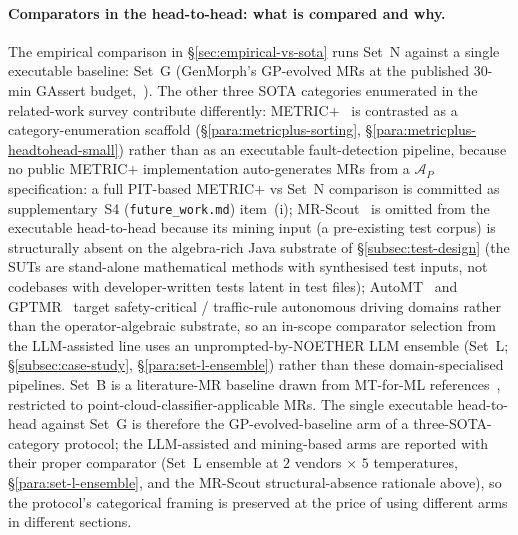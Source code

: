 \documentclass[acmsmall,screen,review]{acmart}
\begin{document}
\paragraph{Comparators in the head-to-head: what is compared and why.}
\label{para:comparators-and-why}
The empirical comparison in \S\ref{sec:empirical-vs-sota} runs Set~N
against a single executable baseline: Set~G (GenMorph's GP-evolved
MRs at the published 30-min GAssert budget,~\cite{GenMorph2024}). The
other three SOTA categories enumerated in the related-work survey
contribute differently: METRIC$+$~\cite{SunMETRICplus2021} is contrasted
as a category-enumeration scaffold (\S\ref{para:metricplus-sorting},
\S\ref{para:metricplus-headtohead-small}) rather than as an executable
fault-detection pipeline, because no public METRIC$+$ implementation
auto-generates MRs from a $\mathcal{A}_{P}$ specification: a full
PIT-based METRIC$+$ vs Set~N comparison is committed as supplementary~S4 (\texttt{future\_work.md})
item~(i); MR-Scout~\cite{MRScout2024} is omitted from the executable
head-to-head because its mining input (a pre-existing test corpus) is
structurally absent on the algebra-rich Java substrate of
\S\ref{subsec:test-design} (the SUTs are stand-alone mathematical
methods with synthesised test inputs, not codebases with developer-written
tests latent in test files); AutoMT~\cite{AutoMT2025} and
GPTMR~\cite{GPTMR2025} target safety-critical / traffic-rule autonomous
driving domains rather than the operator-algebraic substrate, so an
in-scope comparator selection from the LLM-assisted line uses an
unprompted-by-NOETHER LLM ensemble (Set~L; \S\ref{subsec:case-study},
\S\ref{para:set-l-ensemble}) rather than these domain-specialised
pipelines. Set~B is a literature-MR baseline drawn from MT-for-ML
references~\cite{Segura2016, Shin2024, AutoMT2025}, restricted to
point-cloud-classifier-applicable MRs. The single executable
head-to-head against Set~G is therefore the GP-evolved-baseline arm
of a three-SOTA-category protocol; the LLM-assisted and mining-based
arms are reported with their proper comparator (Set~L ensemble at
$2$ vendors $\times$ $5$ temperatures, \S\ref{para:set-l-ensemble}, and
the MR-Scout structural-absence rationale above), so the protocol's
categorical framing is preserved at the price of using different
arms in different sections.


\end{document}
